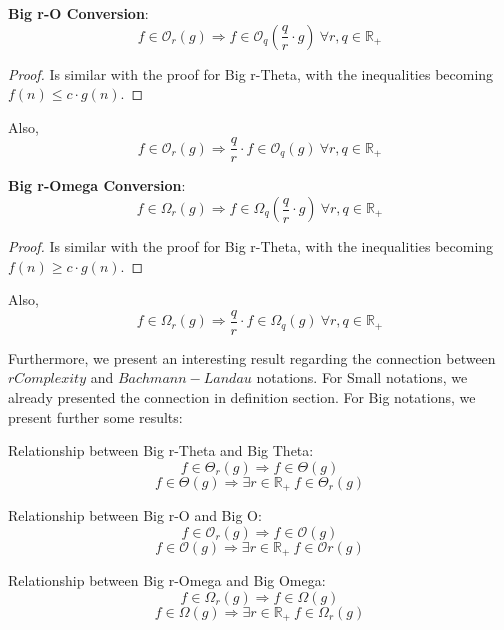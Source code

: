 \begin{theorem} \textbf{Big r-O Conversion}:  
  \[  f \in \mathcal{O}_{r}(g) \Rightarrow f \in \mathcal{O}_{q} \left( \frac{q}{r} \cdot g \right) \ \forall r,q \in \mathbb{R}_{+}\]
\end{theorem} 
\begin{proof} 
Is similar with the proof for Big r-Theta, with the inequalities becoming $f(n) \leq c \cdot g(n)$.
\end{proof} 
\begin{corollary} 
Also, 
  \[  f \in \mathcal{O}_{r}(g) \Rightarrow \frac{q}{r} \cdot f \in \mathcal{O}_{q} \left(  g \right) \ \forall r,q \in \mathbb{R}_{+}\]
\end{corollary} 
\begin{theorem} \textbf{Big r-Omega Conversion}: 
 \[  f \in \Omega_{r}(g) \Rightarrow f \in \Omega_{q} \left( \frac{q}{r} \cdot g \right) \ \forall r,q \in \mathbb{R}_{+}\]
 \end{theorem} 
\begin{proof} 
Is similar with the proof for Big r-Theta, with the inequalities becoming $f(n) \geq c \cdot g(n)$.
\end{proof} 
\begin{corollary} 
 Also, 
  \[  f \in \Omega_{r}(g) \Rightarrow \frac{q}{r} \cdot f \in \Omega_{q} \left( g \right) \ \forall r,q \in \mathbb{R}_{+}\]
\end{corollary} 
 
Furthermore, we present an interesting result regarding the connection between $rComplexity$ and $Bachmann-Landau$ notations. For Small notations, we already presented the connection in definition section. For Big notations, we present further some results:

\begin{theorem} Relationship between Big r-Theta and Big Theta: 
 \[  f \in \Theta_{r}(g) \Rightarrow f \in \Theta (g) \]
 \[  f \in \Theta(g) \Rightarrow \exists r \in \mathbb{R}_{+}\ f \in \Theta_{r}(g) \]
\end{theorem} 

\begin{theorem} Relationship between Big r-O and Big O: 
 \[  f \in \mathcal{O}_{r}(g) \Rightarrow f \in \mathcal{O} (g) \]
 \[  f \in \mathcal{O}(g) \Rightarrow \exists r \in \mathbb{R}_{+}\ f \in \mathcal{O}{r}(g) \]
\end{theorem} 

 
\begin{theorem} Relationship between Big r-Omega and Big Omega: 
 \[  f \in \Omega_{r}(g) \Rightarrow f \in \Omega (g) \]
 \[  f \in \Omega(g) \Rightarrow \exists r \in \mathbb{R}_{+}\ f \in \Omega_{r}(g) \]
\end{theorem} 

